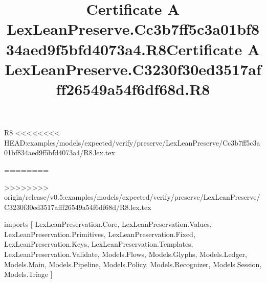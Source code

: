 \begin{lexlean}{R8}
<<<<<<<< HEAD:examples/models/expected/verify/preserve/LexLeanPreserve/Cc3b7ff5c3a01bf834aed9f5bfd4073a4/R8.lex.tex
\title{Certificate A LexLeanPreserve.Cc3b7ff5c3a01bf834aed9f5bfd4073a4.R8}
========
\title{Certificate A LexLeanPreserve.C3230f30ed3517afff26549a54f6df68d.R8}
>>>>>>>> origin/release/v0.5:examples/models/expected/verify/preserve/LexLeanPreserve/C3230f30ed3517afff26549a54f6df68d/R8.lex.tex
\begin{coremodule}
imports [
  LexLeanPreservation.Core,
  LexLeanPreservation.Values,
  LexLeanPreservation.Primitives,
  LexLeanPreservation.Fixed,
  LexLeanPreservation.Keys,
  LexLeanPreservation.Templates,
  LexLeanPreservation.Validate,
  Models.Flows,
  Models.Glyphs,
  Models.Ledger,
  Models.Main,
  Models.Pipeline,
  Models.Policy,
  Models.Recognizer,
  Models.Session,
  Models.Triage
]


\end{coremodule}
\end{lexlean}
